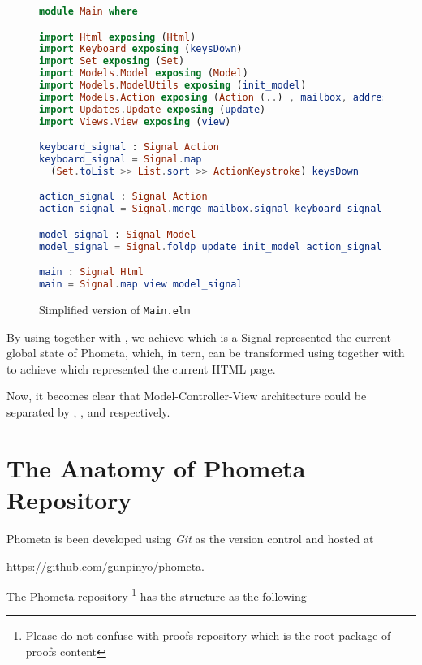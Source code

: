 \documentclass[master.tex]{subfiles}
\begin{document}
\begin{figure}[H]
\begin{framed}
\begin{lstlisting}[language=elm]
module Main where

import Html exposing (Html)
import Keyboard exposing (keysDown)
import Set exposing (Set)
import Models.Model exposing (Model)
import Models.ModelUtils exposing (init_model)
import Models.Action exposing (Action (..) , mailbox, address)
import Updates.Update exposing (update)
import Views.View exposing (view)

keyboard_signal : Signal Action
keyboard_signal = Signal.map
  (Set.toList >> List.sort >> ActionKeystroke) keysDown

action_signal : Signal Action
action_signal = Signal.merge mailbox.signal keyboard_signal

model_signal : Signal Model
model_signal = Signal.foldp update init_model action_signal

main : Signal Html
main = Signal.map view model_signal
\end{lstlisting}
\end{framed}
\caption{Simplified version of \texttt{Main.elm}}
\label{fig:implementation-simplified-main}
\end{figure}

By using  together with , we achieve  which is a Signal represented the
current global state of Phometa, which, in tern, can be transformed using
 together with  to achieve
 which represented the current HTML page.

Now, it becomes clear that Model-Controller-View architecture could be separated
by , , and  respectively.

\newpage

\section{The Anatomy of Phometa Repository}

Phometa is been developed using \emph{Git} as the version control and hosted
at

\url{https://github.com/gunpinyo/phometa}.

The Phometa repository \footnote{Please do not confuse with proofs repository
  which is the root package of proofs content} has the structure as the
following
\end{document}
